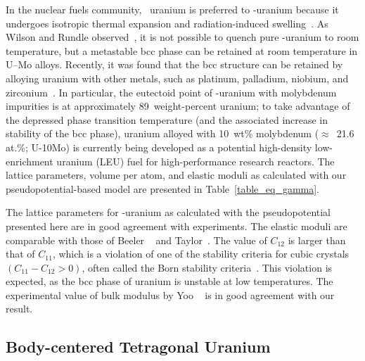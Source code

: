 In the nuclear fuels community, \textgamma~uranium is preferred to
\textalpha-uranium because it undergoes isotropic thermal expansion
and radiation-induced swelling~\cite{kittel1993history}. 
As Wilson and Rundle observed~\cite{wilson1949structures},
it is not possible to quench pure \textgamma-uranium to room
temperature, but a metastable bcc phase can be retained at room temperature
in U--Mo alloys.
Recently, it was found that the bcc structure can be retained by alloying
uranium with other metals, such as platinum, palladium, niobium, and
zirconium~\cite{kim2016superconductivity}.
In particular, the eutectoid point of \textgamma-uranium with molybdenum
impurities is at approximately 89~weight-percent uranium; to take advantage of
the depressed phase transition temperature (and the associated increase in
stability of the bcc phase), uranium alloyed with 10~wt\% molybdenum
($\approx$~21.6 at.\%; U-10Mo) is currently being developed as a potential
high-density low-enrichment uranium (LEU) fuel for high-performance research
reactors. The lattice parameters, volume per atom, and elastic moduli as
calculated with our pseudopotential-based model are presented in
Table~\ref{table_eq_gamma}.

The lattice parameters for \textgamma-uranium as calculated with the
pseudopotential presented here are in good agreement with experiments.
The elastic moduli are comparable with those of
Beeler \etal~\cite{beeler2013first} and Taylor~\cite{taylor2008evaluation}.
The value of $C_{12}$ is larger than that of $C_{11}$, which is
a violation of one of the stability criteria for cubic crystals
$(C_{11}-C_{12} > 0)$, often called the Born stability
criteria~\cite{born1940stability,born1954dynamical,Mouhat2014}. This violation
is expected, as the bcc phase of uranium is unstable at low temperatures. The
experimental value of bulk modulus by Yoo \etal~\cite{yoo1998phase} is in good
agreement with our result.

\subsection{Body-centered Tetragonal Uranium}
\label{subsec_bct}

